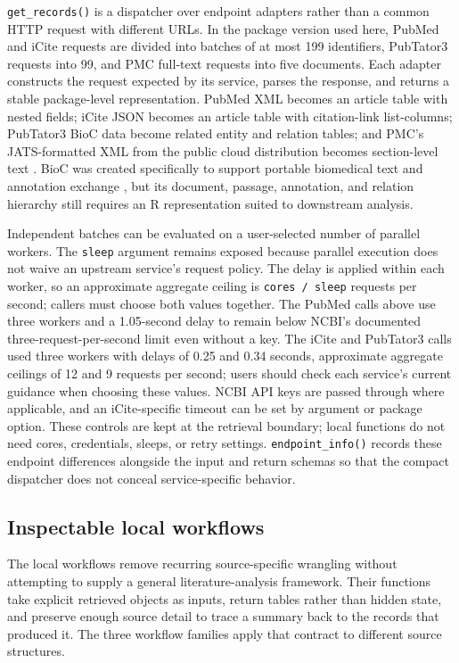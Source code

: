 \texttt{get\_records()} is a dispatcher over endpoint adapters rather than a common
HTTP request with different URLs. In the package version used here, PubMed and
iCite requests
are divided into batches of at most 199 identifiers, PubTator3 requests into 99,
and PMC full-text requests into five documents. Each adapter constructs the
request expected by its service, parses the response, and returns a stable
package-level representation. PubMed XML becomes an article table with nested
fields; iCite JSON becomes an article table with citation-link list-columns;
PubTator3 BioC data become related entity and relation tables; and PMC's
JATS-formatted XML from the public cloud distribution becomes section-level
text \citep{nlm2026pmccloud}. BioC was created specifically to support portable
biomedical text and annotation exchange \citep{comeau2013bioc}, but its document,
passage, annotation, and relation hierarchy still requires an R representation
suited to downstream analysis.

Independent batches can be evaluated on a user-selected number of parallel
workers. The \texttt{sleep} argument remains exposed because parallel execution does
not waive an upstream service's request policy. The delay is applied within
each worker, so an approximate aggregate ceiling is \texttt{cores\ /\ sleep} requests
per second; callers must choose both values together. The PubMed calls above
use three workers and a 1.05-second delay to remain below NCBI's documented
three-request-per-second limit even without a key. The iCite and PubTator3 calls
used three workers with delays of 0.25 and 0.34 seconds, approximate aggregate
ceilings of 12 and 9 requests per second; users should check each service's
current guidance when choosing these values. NCBI API keys are passed through
where applicable, and an iCite-specific timeout can be set by argument or
package option. These controls are kept at the retrieval boundary; local
functions do not need cores, credentials, sleeps, or retry settings.
\texttt{endpoint\_info()} records these endpoint differences alongside the input and
return schemas so that the compact dispatcher does not conceal
service-specific behavior.

\subsection{Inspectable local workflows}\label{inspectable-local-workflows}

The local workflows remove recurring source-specific wrangling without
attempting to supply a general literature-analysis framework. Their functions
take explicit retrieved objects as inputs, return tables rather than hidden
state, and preserve enough source detail to trace a summary back to the records
that produced it. The three workflow families apply that contract to different
source structures.

